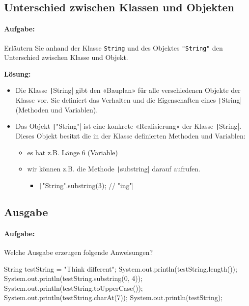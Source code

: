 \documentclass[a4paper,10pt, dvipsnames]{report}
\begin{document}
\subsection{Unterschied zwischen Klassen und Objekten}

\paragraph{Aufgabe:}
Erläutern Sie anhand der Klasse \texttt{String} und des Objektes \texttt{"String"} den Unterschied zwischen Klasse und Objekt.

\textbf{Lösung:}

\begin{itemize}
    \item Die Klasse \texttt|String| gibt den «Bauplan» für alle verschiedenen Objekte der Klasse vor. Sie definiert das Verhalten und die Eigenschaften eines \texttt|String| (Methoden und Variablen).
    \item Das Objekt \texttt|"String"| ist eine konkrete «Realisierung» der Klasse \texttt|String|. Dieses Objekt besitzt die in der Klasse definierten Methoden und Variablen:
    \begin{itemize}
        \item es hat z.B. Länge 6 (Variable)
        \item wir können z.B. die Methode \texttt|substring| darauf aufrufen.
        \begin{itemize}
            \item \texttt|"String".substring(3); // "ing"|
        \end{itemize}
    \end{itemize}
\end{itemize}

\subsection{Ausgabe}

\paragraph{Aufgabe:}
Welche Ausgabe erzeugen folgende Anweisungen?
\begin{javacodebox}
String testString = "Think different";
System.out.println(testString.length());
System.out.println(testString.substring(0, 4));
System.out.println(testString.toUpperCase());
System.out.println(testString.charAt(7));
System.out.println(testString);
\end{javacodebox}
\end{document}
